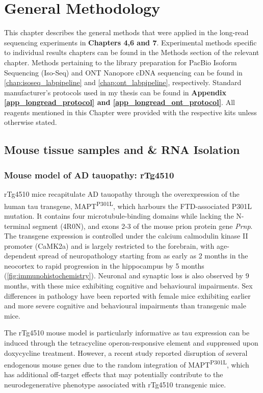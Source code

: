 \chapter{General Methodology}\label{ch: general methodology}

This chapter describes the general methods that were applied in the long-read sequencing experiments in \textbf{Chapters 4,6 and 7}. Experimental methods specific to individual results chapters can be found in the Methods section of the relevant chapter. Methods pertaining to the library preparation for PacBio Isoform Sequencing (Iso-Seq) and ONT Nanopore cDNA sequencing can be found in \cref{chap:isoseq_labpipeline} and \cref{chap:ont_labpipeline}, respectively. Standard manufacturer's protocols used in my thesis can be found in \textbf{Appendix \ref{app_longread_protocol} and \ref{app_longread_ont_protocol}}. All reagents mentioned in this Chapter were provided with the respective kits unless otherwise stated.

\section{Mouse tissue samples and \& RNA Isolation}

\subsection{Mouse model of AD tauopathy: rTg4510} 
rTg4510 mice recapitulate AD tauopathy through the overexpression of the human tau transgene, MAPT\textsuperscript{P301L}, which harbours the FTD-associated P301L mutation. It contains four microtubule-binding domains while lacking the N-terminal segment (4R0N), and exons 2-3 of the mouse prion protein gene \textit{Prnp}. The transgene expression is controlled under the calcium calmodulin kinase II promoter (CaMK2a) and is largely restricted to the forebrain, with age-dependent spread of neuropathology starting from as early as 2 months in the neocortex to rapid progression in the hippocampus by 5 months (\cref{fig:immunohistochemistry}). Neuronal and synaptic loss is also observed by 9 months, with these mice exhibiting cognitive and behavioural impairments. Sex differences in pathology have been reported with female mice exhibiting earlier and more severe cognitive and behavioural impairments than transgenic male mice\cite{M2011}. 

The rTg4510 mouse model is particularly informative as tau expression can be induced through the tetracycline operon-responsive element and suppressed upon doxycycline treatment\cite{Ramsden2005}. However, a recent study reported disruption of several endogenous mouse genes due to the random integration of MAPT\textsuperscript{P301L}, which has additional off-target effects that may potentially contribute to the neurodegenerative phenotype associated with rTg4510 transgenic mice\cite{Gamache2019}. 
 

